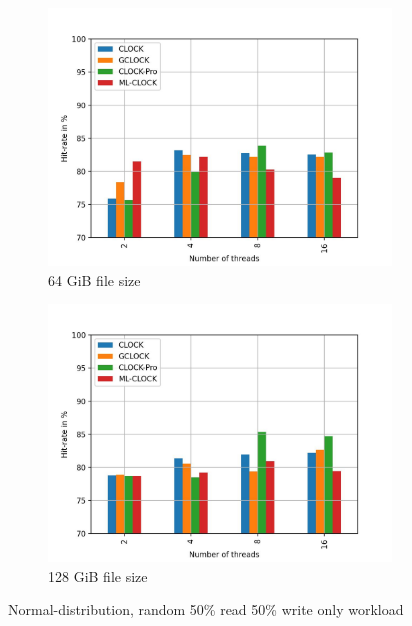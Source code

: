 \documentclass[
	12pt,
	a4paper,
	abstract,
	bibliography=totoc,
	chapterprefix,
	headings=openright,
	numbers=endperiod,
	parskip=half,
	twoside,
]{scrreprt}
\begin{document}
\begin{figure}[H]
\begin{subfigure}{0.4\textwidth}
		\includegraphics[width=\textwidth]{multi_64_gb_rw_50to50_normal.jpg}		
		\caption{64 GiB file size}
		\label{fig:rw_50to50 64 normal}
	\end{subfigure}
	\hfill
	\begin{subfigure}{0.4\textwidth}
		\includegraphics[width=\textwidth]{multi_128_gb_rw_50to50_normal.jpg}		
		\caption{128 GiB file size}
		\label{fig:rw_50to50 128 normal}
	\end{subfigure}
	\caption{Normal-distribution, random 50\% read 50\% write only workload}
	\label{fig:multi normal rw_50to50}
\end{figure}
\end{document}
